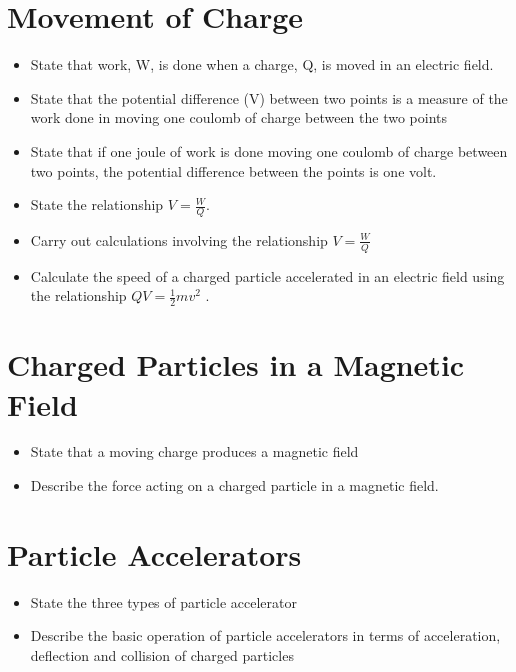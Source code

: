 \section{Movement of Charge}
\begin{multicols}{2}
	\begin{itemize}
        \item State that work, W, is done when a charge, Q, is moved in an 
            electric field.

        \item State that the potential difference (V) between two points is a
            measure of the work done in moving one coulomb of charge between
            the two points

        \item State that if one joule of work is done moving one coulomb of 
            charge between two points, the potential difference between the 
            points is one volt.

        \item State the relationship $V = \frac{W}{Q}$.

        \item Carry out calculations involving the relationship
            $V = \frac{W}{Q}$

        \item Calculate the speed of a charged particle accelerated in an 
            electric field using the relationship 
            $QV = \frac{1}{2} mv^2$ .
	\end{itemize}
\end{multicols}

\section{Charged Particles in a Magnetic Field}
\begin{multicols}{2}
	\begin{itemize}
        \item State that a moving charge produces a magnetic field
        \item Describe the force acting on a charged particle in a magnetic 
            field.
	\end{itemize}
\end{multicols}

\section{Particle Accelerators}
\begin{multicols}{2}
	\begin{itemize}
        \item State the three types of particle accelerator
        \item Describe the basic operation of particle accelerators in terms of
            acceleration, deflection and collision of charged particles
	\end{itemize}
\end{multicols}

